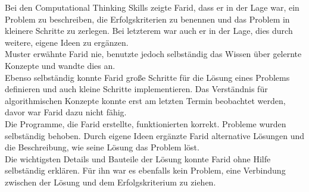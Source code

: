 Bei den Computational Thinking Skills zeigte Farid, dass er in der Lage war, ein Problem zu beschreiben, die Erfolgskriterien zu benennen und das Problem in kleinere Schritte zu zerlegen. Bei letzterem war auch er in der Lage, dies durch weitere, eigene Ideen zu ergänzen.\\
Muster erwähnte Farid nie, benutzte jedoch selbständig das Wissen über gelernte Konzepte und wandte dies an.\\
Ebenso selbständig konnte Farid große Schritte für die Lösung eines Problems definieren und auch kleine Schritte implementieren. Das Verständnis für algorithmischen Konzepte konnte erst am letzten Termin beobachtet werden, davor war Farid dazu nicht fähig.\\
Die Programme, die Farid erstellte, funktionierten korrekt. Probleme wurden selbständig behoben. Durch eigene Ideen ergänzte Farid alternative Lösungen und die Beschreibung, wie seine Lösung das Problem löst.\\
Die wichtigsten Details und Bauteile der Lösung konnte Farid ohne Hilfe selbständig erklären. Für ihn war es ebenfalls kein Problem, eine Verbindung zwischen der Lösung und dem Erfolgskriterium zu ziehen. 


